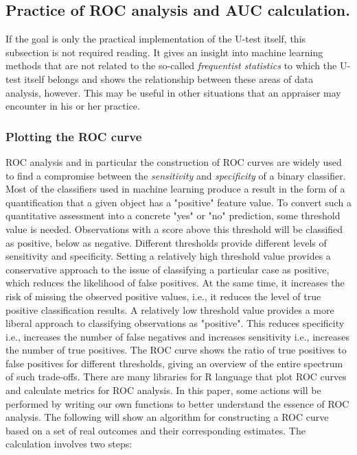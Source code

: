 \documentclass[]{scrreprt}
\begin{document}
\subsection{Practice of ROC analysis and AUC calculation.}\label{ROC-AUC-theory}
If the goal is only the practical implementation of the U-test itself, this subsection is not required reading. It gives an insight into machine learning methods that are not related to the so-called \emph{frequentist statistics} to which the U-test itself belongs and shows the relationship between these areas of data analysis, however. This may be useful in other situations that an appraiser may encounter in his or her practice.
%
\subsubsection{Plotting the ROC curve}\label{plot-ROC-theory}
%
%
ROC analysis and in particular the construction of ROC curves are widely used to find a compromise between the \emph{sensitivity} and \emph{specificity} of a binary classifier. Most of the classifiers used in machine learning produce a result in the form of a quantification that a given object has a "positive" feature value. To convert such a quantitative assessment into a concrete "yes" or "no" prediction, some threshold value is needed. Observations with a score above this threshold will be classified as positive, below as negative. Different thresholds provide different levels of sensitivity and specificity. Setting a relatively high threshold value provides a conservative approach to the issue of classifying a particular case as positive, which reduces the likelihood of false positives. At the same time, it increases the risk of missing the observed positive values, i.e., it reduces the level of true positive classification results. A relatively low threshold value provides a more liberal approach to classifying observations as "positive". This reduces specificity i.e., increases the number of false negatives and increases sensitivity i.e., increases the number of true positives. The ROC curve shows the ratio of true positives to false positives for different thresholds, giving an overview of the entire spectrum of such trade-offs. There are many libraries for R language that plot ROC curves and calculate metrics for ROC analysis. In this paper, some actions will be performed by writing our own functions to better understand the essence of ROC analysis. The following will show an algorithm for constructing a ROC curve based on a set of real outcomes and their corresponding estimates. The calculation involves two steps:
\end{document}
